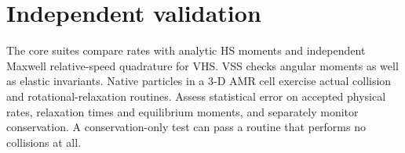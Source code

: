 \section{Independent validation}
The core suites compare rates with analytic HS moments and independent
Maxwell relative-speed quadrature for VHS. VSS checks angular moments as well
as elastic invariants. Native particles in a 3-D AMR cell exercise actual
collision and rotational-relaxation routines. Assess statistical error on
accepted physical rates, relaxation times and equilibrium moments, and
separately monitor conservation. A conservation-only test can pass a routine
that performs no collisions at all.

